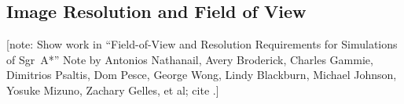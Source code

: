 \documentclass[twocolumn,tighten,dvipsnames]{aastex63}
\newcommand\note[1]{{\color{OliveGreen}[note: #1]}}
\begin{document}
\subsection{Image Resolution and Field of View}
\label{sec:res-FoV}

\note{Show work in ``Field-of-View and Resolution Requirements for
  Simulations of Sgr~A*'' Note by Antonios Nathanail, Avery Broderick,
  Charles Gammie, Dimitrios Psaltis, Dom Pesce, George Wong, Lindy
  Blackburn, Michael Johnson, Yosuke Mizuno, Zachary Gelles, et al;
  cite \citet{2020arXiv200406210P}.}






\end{document}
